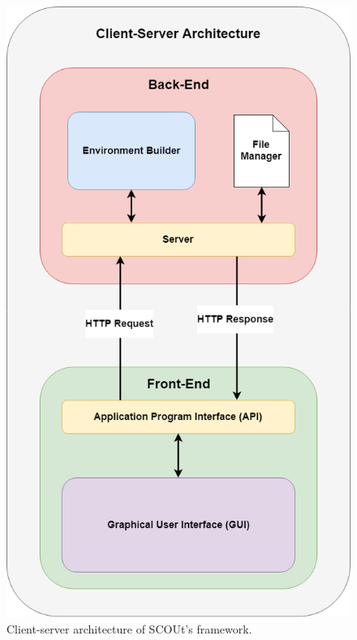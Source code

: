 \begin{figure}[H]
  \centering
  \includegraphics[width=0.6\columnwidth]{Figures/client_server_architecture.png}
  \caption{Client-server architecture of SCOUt's framework.}
  \label{fig:client_server_architecture}
\end{figure}


